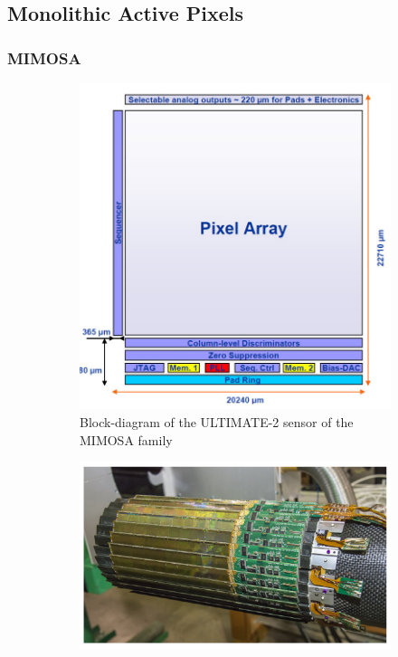     \subsection{Monolithic Active Pixels}
    \subsubsection{MIMOSA}
    \begin{figure}
            \centering
            \begin{subfigure}[b]{0.49\textwidth}
                \centering
                \includegraphics[width=\linewidth]{figures/pixel_detectors_usage/MIMOSA.png}          
                \caption{Block-diagram of the ULTIMATE-2 sensor of the MIMOSA family}
                \label{fig:MIMOSA}
            \end{subfigure}
            \hfill
            \begin{subfigure}[b]{0.49\textwidth}
                \centering
                \includegraphics[width=\linewidth]{figures/pixel_detectors_usage/STAR.png}

\end{subfigure}
\end{figure}
